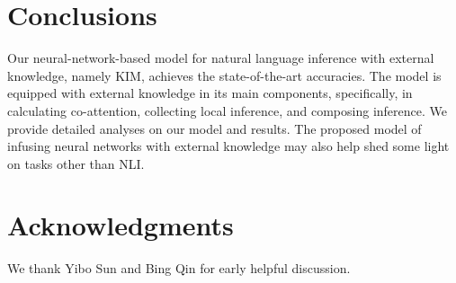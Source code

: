 \documentclass[11pt,a4paper]{article}
\begin{document}
\begin{table}[t!]
\renewcommand{\arraystretch}{0.9}
\centering
{}
\caption{Examples. Word in bold are key words in making final prediction. \textbf{P} indicates a predicted label and \textbf{G} indicates gold-standard label. \textit{e} and \textit{c} denote \textit{entailment} and \textit{contradiction}, respectively.}
\label{tab:examples}
\end{table}

\section{Conclusions}
Our neural-network-based model for natural language inference with external knowledge, namely KIM, achieves the state-of-the-art accuracies. The model is equipped with external knowledge in its main components, specifically, in calculating co-attention, collecting local inference, and composing inference. We provide detailed analyses on our model and results. The proposed model of infusing neural networks with external knowledge may also help shed some light on tasks other than NLI.

\section*{Acknowledgments}
We thank Yibo Sun and Bing Qin for early helpful discussion.

\newpage


\end{document}
